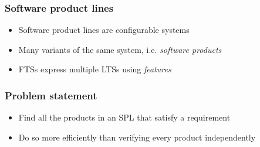 \documentclass[aspectratio=169]{beamer}
\begin{document}
\begin{frame}[t]
\frametitle{Software product lines}
\begin{itemize}
	\item Software product lines are configurable systems
	\item Many variants of the same system, i.e. \textit{software products}
	\item FTSs express multiple LTSs using \textit{features}
\end{itemize}
\end{frame}

\begin{frame}[t]
\frametitle{Problem statement}
	\begin{itemize}
		\item Find all the products in an SPL that satisfy a requirement
	\end{itemize}
	\begin{center}
	\end{center}
	\begin{itemize}
		\item Do so more efficiently than verifying every product independently
	\end{itemize}
\end{frame}

\end{document}
